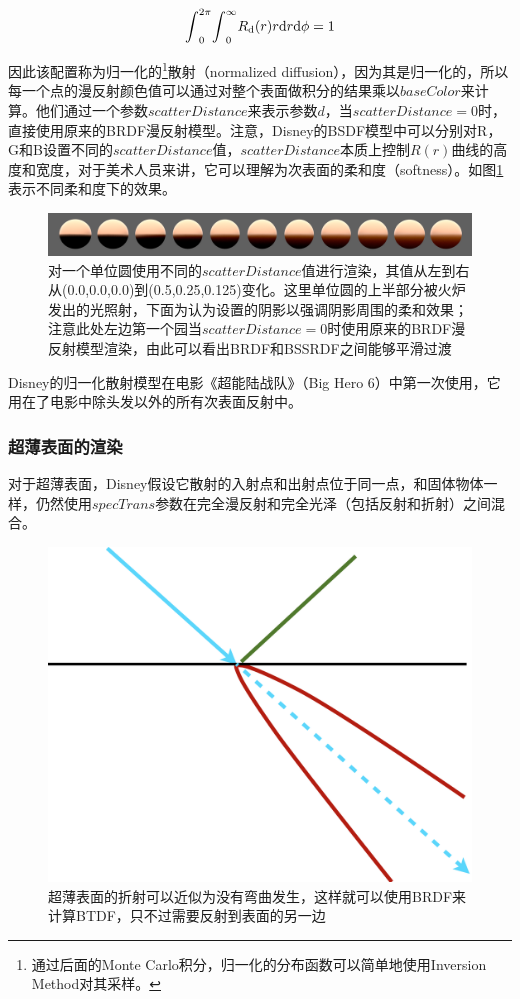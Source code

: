 \begin{equation}
	{\rm \int}^{2\pi}_0{\rm \int}^\infty_0 R_{\rm d}(r)r{\rm d}r{\rm d}\phi=1
\end{equation}

\noindent 因此该配置称为归一化的\footnote{通过后面的Monte Carlo积分，归一化的分布函数可以简单地使用Inversion Method对其采样。}散射（normalized diffusion），因为其是归一化的，所以每一个点的漫反射颜色值可以通过对整个表面做积分的结果乘以$baseColor$来计算。他们通过一个参数$scatterDistance$来表示参数$d$，当$scatterDistance=0$时，直接使用原来的BRDF漫反射模型。注意，Disney的BSDF模型中可以分别对R，G和B设置不同的$scatterDistance$值，$scatterDistance$本质上控制$R(r)$曲线的高度和宽度，对于美术人员来讲，它可以理解为次表面的柔和度（softness）。如图\ref{f:intro-bssrdf-sss}表示不同柔和度下的效果。

\begin{figure}
\begin{fullwidth}
	\includegraphics[width=\thewidth]{figures/intro/spheres-SSS}
	\caption{对一个单位圆使用不同的$scatterDistance$值进行渲染，其值从左到右从(0.0,0.0,0.0)到(0.5,0.25,0.125)变化。这里单位圆的上半部分被火炉发出的光照射，下面为认为设置的阴影以强调阴影周围的柔和效果；注意此处左边第一个园当$scatterDistance=0$时使用原来的BRDF漫反射模型渲染，由此可以看出BRDF和BSSRDF之间能够平滑过渡}
	\label{f:intro-bssrdf-sss}
\end{fullwidth}
\end{figure}

Disney的归一化散射模型在电影《超能陆战队》（Big Hero 6）中第一次使用，它用在了电影中除头发以外的所有次表面反射中。




\subsubsection{超薄表面的渲染}
对于超薄表面，Disney假设它散射的入射点和出射点位于同一点，和固体物体一样，仍然使用$specTrans$参数在完全漫反射和完全光泽（包括反射和折射）之间混合。

\begin{figure}
\sidecaption
	\includegraphics[width=.35\textwidth]{figures/intro/thin-refraction}
	\caption{超薄表面的折射可以近似为没有弯曲发生，这样就可以使用BRDF来计算BTDF，只不过需要反射到表面的另一边}
	\label{f:intro-thin-1}
\end{figure}

